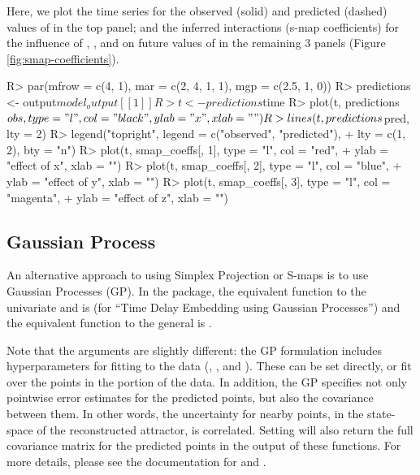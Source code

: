 \documentclass[article]{jss}
\begin{document}
Here, we plot the time series for the observed (solid) and predicted (dashed) values of  in the top panel; and the inferred interactions (s-map coefficients) for the influence of , , and  on future values of  in the remaining 3 panels (Figure \ref{fig:smap-coefficients}).

\begin{Schunk}
\begin{Sinput}
R> par(mfrow = c(4, 1), mar = c(2, 4, 1, 1), mgp = c(2.5, 1, 0))
R> predictions <- output$model_output[[1]]
R> t <- predictions$time
R> plot(t, predictions$obs, type = "l", col = "black", ylab = "x", xlab = "")
R> lines(t, predictions$pred, lty = 2)
R> legend("topright", legend = c("observed", "predicted"), 
+         lty = c(1, 2), bty = "n")
R> plot(t, smap_coeffs[, 1], type = "l", col = "red", 
+       ylab = "effect of x", xlab = "")
R> plot(t, smap_coeffs[, 2], type = "l", col = "blue", 
+       ylab = "effect of y", xlab = "")
R> plot(t, smap_coeffs[, 3], type = "l", col = "magenta", 
+       ylab = "effect of z", xlab = "")
\end{Sinput}
\end{Schunk}

\subsection{Gaussian Process}\label{sec:gaussian-processes}

An alternative approach to using Simplex Projection or S-maps is to use Gaussian Processes (GP). In the  package, the equivalent function to the univariate  and  is  (for ``Time Delay Embedding using Gaussian Processes'') and the equivalent function to the general  is .

Note that the arguments are slightly different: the GP formulation includes hyperparameters for fitting to the data (, , and ). These can be set directly, or fit over the points in the  portion of the data. In addition, the GP specifies not only pointwise error estimates for the predicted points, but also the covariance between them. In other words, the uncertainty for nearby points, in the state-space of the reconstructed attractor, is correlated. Setting  will also return the full covariance matrix for the predicted points in the output of these functions. For more details, please see the documentation for  and .
\end{document}
